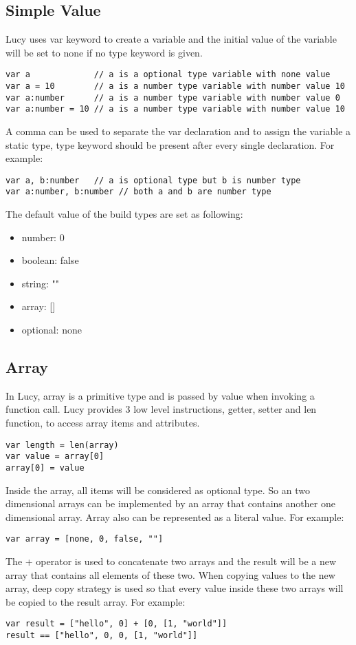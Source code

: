 \subsection{Simple Value}
Lucy uses var keyword to create a variable and the initial value of the variable will be set to none if no type keyword is given.
\begin{lstlisting}
var a             // a is a optional type variable with none value
var a = 10        // a is a number type variable with number value 10
var a:number      // a is a number type variable with number value 0
var a:number = 10 // a is a number type variable with number value 10
\end{lstlisting}
A comma can be used to separate the var declaration and to assign the variable a static type, type keyword should be present after every single declaration. For example:
\begin{lstlisting}
var a, b:number   // a is optional type but b is number type
var a:number, b:number // both a and b are number type
\end{lstlisting}
The default value of the build types are set as following:
\begin{itemize}
  \item number: 0
  \item boolean: false
  \item string: ""
  \item array: []
  \item optional: none
\end{itemize}

\subsection{Array}
In Lucy, array is a primitive type and is passed by value when invoking a function call. Lucy provides 3 low level instructions, getter, setter and len function, to access array items and attributes.
\begin{lstlisting}
var length = len(array)
var value = array[0]
array[0] = value
\end{lstlisting}
Inside the array, all items will be considered as optional type. So an two dimensional arrays can be implemented by an array that contains another one dimensional array. Array also can be represented as a literal value. For example:
\begin{lstlisting}
var array = [none, 0, false, ""]
\end{lstlisting}
The + operator is used to concatenate two arrays and the result will be a new array that contains all elements of these two. When copying values to the new array, deep copy strategy is used so that every value inside these two arrays will be copied to the result array. For example:
\begin{lstlisting}
var result = ["hello", 0] + [0, [1, "world"]]
result == ["hello", 0, 0, [1, "world"]]
\end{lstlisting}

